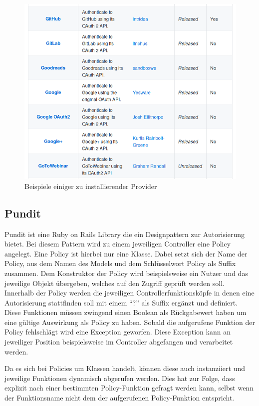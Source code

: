 \documentclass[11pt]{article}
\begin{document}
	\begin{figure}[h]
		\includegraphics[width=\textwidth]{images/provider-list.png}
		\caption{Beispiele einiger zu installierender Provider}
		\label{fig:provider-list}
	\end{figure}

	\subsection{Pundit}
	\label{sec: pundit}
	Pundit ist eine Ruby on Rails Library die ein Designpattern zur Autorisierung bietet. Bei diesem Pattern wird zu einem jeweiligen Controller eine Policy angelegt. Eine Policy ist hierbei nur eine Klasse. Dabei setzt sich der Name der Policy, aus dem Namen des Models und dem Schlüsselwort Policy als Suffix zusammen. Dem Konstruktor der Policy wird beispielsweise ein Nutzer und das jeweilige Objekt übergeben, welches auf den Zugriff geprüft werden soll. Innerhalb der Policy werden die jeweiligen Controllerfunktionsköpfe in denen eine Autorisierung stattfinden soll mit einem \enquote{?} als Suffix ergänzt und definiert. Diese Funktionen müssen zwingend einen Boolean als Rückgabewert haben um eine gültige Auswirkung als Policy zu haben. Sobald die aufgerufene Funktion der Policy fehlschlägt wird eine Exception geworfen. Diese Exception kann an jeweiliger Position beispielsweise im Controller abgefangen und verarbeitet werden. 
	
	Da es sich bei Policies um Klassen handelt, können diese auch instanziiert und jeweilige Funktionen dynamisch abgerufen werden. Dies hat zur Folge, dass explizit nach einer bestimmten Policy-Funktion gefragt werden kann, selbst wenn der Funktionsname nicht dem der aufgerufenen Policy-Funktion entspricht.
	
\end{document}
